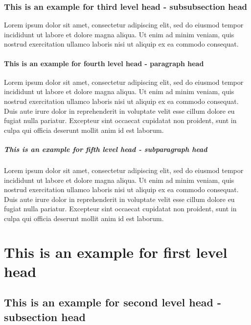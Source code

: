 \documentclass[unnumsec,webpdf,modern,large]{oup-authoring-template}%
\theoremstyle{thmstyleone}%
\theoremstyle{thmstyletwo}%
\theoremstyle{thmstylethree}%
\begin{document}
\subsubsection{This is an example for third level head - subsubsection head}\label{subsubsec1}

Lorem ipsum dolor sit amet, consectetur adipiscing elit, sed do
eiusmod tempor incididunt ut labore et dolore magna aliqua. Ut enim ad minim veniam, quis nostrud exercitation ullamco laboris nisi ut aliquip ex ea commodo consequat. %

\paragraph{This is an example for fourth level head - paragraph head}

Lorem ipsum dolor sit amet, consectetur adipiscing elit, sed do eiusmod tempor incididunt ut labore et dolore magna aliqua. Ut enim ad minim veniam, quis nostrud exercitation ullamco laboris nisi ut aliquip ex ea commodo consequat. Duis aute irure dolor in reprehenderit in voluptate velit esse cillum dolore eu fugiat nulla pariatur. Excepteur sint occaecat cupidatat non proident, sunt in culpa qui officia deserunt mollit anim id est laborum.

\subparagraph{This is an example for fifth level head - subparagraph head}

Lorem ipsum dolor sit amet, consectetur adipiscing elit, sed do eiusmod tempor incididunt ut labore et dolore magna aliqua. Ut enim ad minim veniam, quis nostrud exercitation ullamco laboris nisi ut aliquip ex ea commodo consequat. Duis aute irure dolor in reprehenderit in voluptate velit esse cillum dolore eu fugiat nulla pariatur. Excepteur sint occaecat cupidatat non proident, sunt in culpa qui officia deserunt mollit anim id est laborum.

\section{This is an example for first level head}\label{sec3}

\subsection{This is an example for second level head - subsection head}\label{subsec2}
\end{document}
